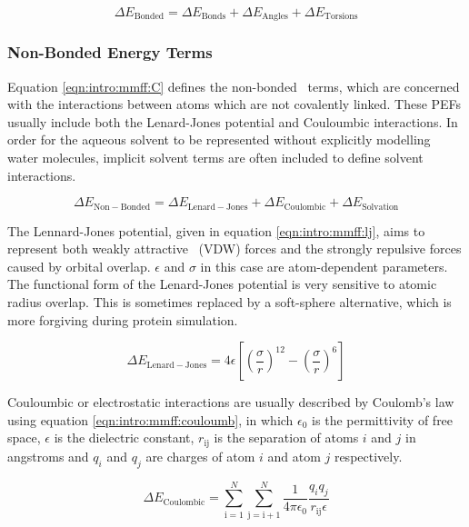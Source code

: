 \begin{equation}
\Delta E_\mathrm{Bonded} = \Delta E_\mathrm{Bonds} + \Delta E_\mathrm{Angles} + \Delta E_\mathrm{Torsions}
\label{eqn:intro:mmff:B}
\end{equation}

\subsubsection{Non-Bonded Energy Terms}

Equation \ref{eqn:intro:mmff:C} defines
the non-bonded \forcefield\ terms, which are concerned with the interactions between atoms which are not covalently linked. These  PEFs  usually include
both the Lenard-Jones potential and Couloumbic interactions.
In order for the aqueous solvent to be represented without explicitly modelling water molecules, implicit solvent terms are often included to define solvent interactions. 

\begin{equation}
\Delta E_\mathrm{Non-Bonded} = \Delta E_\mathrm{Lenard-Jones} + \Delta E_\mathrm{Coulombic} + \Delta E_\mathrm{Solvation}
\label{eqn:intro:mmff:C}
\end{equation}

The Lennard-Jones potential, given in equation \ref{eqn:intro:mmff:lj}, aims to represent both weakly attractive \vdw\ (VDW)  forces and the strongly repulsive forces caused by orbital overlap. $\epsilon$ and $\sigma$ in this case are atom-dependent parameters. The functional form of the Lenard-Jones potential is very sensitive to atomic
radius overlap. This is sometimes replaced
by a soft-sphere alternative, which is more forgiving during protein simulation.

\begin{equation}
\Delta E_\mathrm{Lenard-Jones} = 4 \epsilon \left[  \left( \frac{\sigma}{r} \right)^{12} - \left( \frac{\sigma}{r} \right)^{6} \right]
\label{eqn:intro:mmff:lj}
\end{equation}

Couloumbic or 
electrostatic interactions are usually described by Coulomb's law using equation \ref{eqn:intro:mmff:couloumb}, in which  $\epsilon_0$ is the permittivity of free space, $\epsilon$ is the dielectric constant, $r_\mathrm{ij}$ is the separation of atoms $i$ and $j$ in angstroms and $q_i$ and $q_j$ are charges of atom $i$ and atom $j$ respectively.

\begin{equation}
\Delta E_\mathrm{Coulombic} = \sum^N_\mathrm{i=1} \sum^N_\mathrm{j=i+1} \frac{1}{4 \pi \epsilon_0 } \frac{q_iq_j}{r_\mathrm{ij}\epsilon}
\label{eqn:intro:mmff:couloumb}
\end{equation}

